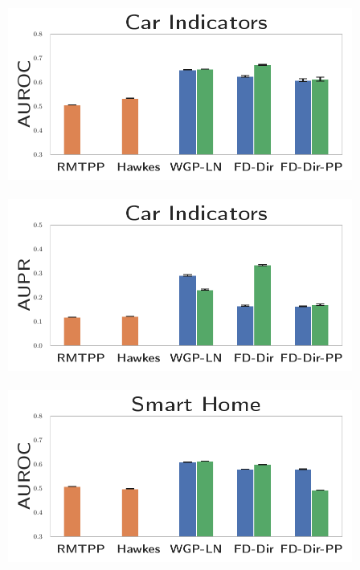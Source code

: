 \begin{figure}
\centering
    \begin{subfigure}{0.25\textwidth}
        \centering
        \includegraphics[width=\linewidth]{sections/010_neurips2019/paper/images/uncertainty-roc-bmw-indicator.pdf}
    \end{subfigure}%
    \begin{subfigure}{0.25\textwidth}
        \centering
        \includegraphics[width=\linewidth]{sections/010_neurips2019/paper/images/uncertainty-apr-bmw-indicator.pdf}
    \end{subfigure}%
        \begin{subfigure}{0.25\textwidth}
        \centering
        \includegraphics[width=\linewidth]{sections/010_neurips2019/paper/images/uncertainty-roc-kast-home.pdf}

\end{subfigure}
\end{figure}
